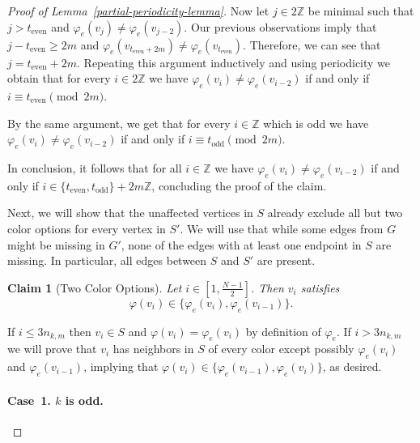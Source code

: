 \documentclass[a4paper,10pt,hidelinks]{amsart}
\renewcommand{\phi}{\ensuremath{\varphi}}
\newtheorem{claim}[theorem]{Claim}
\newenvironment{claimproof}[1][\proofname]{\proof[#1]\renewcommand{\qedsymbol}{$\blacksquare$}}{\endproof}
\theoremstyle{definition}
\begin{document}
\begin{proof}[Proof of Lemma~\ref{partial-periodicity-lemma}]
\begin{claimproof}[Proof of Claim~\ref{structure-claim}]
        Now let $j \in 2\mathbb{Z}$ be minimal such that $j > t_{\text{even}}$ and $\varphi_e(v_j) \neq \varphi_e(v_{j - 2})$. Our previous observations imply that $j - t_{\text{even}} \geq 2m$ and $\varphi_e(v_{t_{\text{even}} + 2m}) \neq \varphi_e(v_{t_{\text{even}}})$. Therefore, we can see that $j = t_{\text{even}} + 2m$. Repeating this argument inductively and using periodicity we obtain that for every $i \in 2\mathbb{Z}$ we have $\varphi_e(v_i) \neq \varphi_e(v_{i - 2})$ if and only if $i \equiv t_{\text{even}} \pmod{2m}$. 

        By the same argument, we get that for every $i \in \mathbb{Z}$ which is odd we have $\varphi_e(v_i) \neq \varphi_e(v_{i - 2})$ if and only if $i \equiv t_{\text{odd}} \pmod{2m}$. 

        In conclusion, it follows that for all $i \in \mathbb{Z}$ we have $\varphi_e(v_i) \neq \varphi_e(v_{i - 2})$ if and only if $i \in \{t_{\text{even}}, t_{\text{odd}}\} + 2m\mathbb{Z}$, concluding the proof of the claim. 
    \end{claimproof}



    Next, we will show that the unaffected vertices in $S$ already exclude all but two color options for every vertex in $S'$. We will use that while some edges from $G$ might be missing in $G'$, none of the edges with at least one endpoint in $S$ are missing. In particular, all edges between $S$ and $S'$ are present.

    \begin{claim}[Two Color Options]\label{two-colors-claim}
        Let $i \in \left[1, \frac{N-1}{2}\right]$. Then $v_i$ satisfies $$\varphi(v_i) \in \{\varphi_e(v_i), \varphi_e(v_{i - 1})\}.$$
    \end{claim}
    \begin{claimproof}
        If $i \leq 3n_{k,m}$ then $v_i \in S$ and $\varphi(v_i) = \varphi_e(v_i)$ by definition of $\varphi_e$. If $i > 3n_{k,m}$ we will prove that $v_i$ has neighbors in $S$ of every color except possibly $\varphi_e(v_i)$ and $\varphi_e(v_{i-1})$, implying that $\phi(v_i)\in \{\phi_e(v_{i-1}),\phi_e(v_i)\}$, as desired. 

        \medskip

        \paragraph*{\textbf{Case~1.} $k$ is odd.} 


\end{claimproof}
\end{proof}
\end{document}
